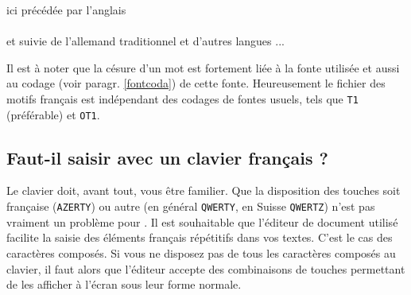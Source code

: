 \documentclass[a4paper,12pt,openright]{article}
\begin{document}
\begin{minipage}{12cm}
ici précédée par l'anglais \\[0.5ex]
\\[1ex]
et suivie de l'allemand traditionnel et d'autres langues ...
\end{minipage}
\indpos

Il est à noter que la césure d'un mot est fortement liée à la fonte utilisée
et aussi au codage (voir paragr. \ref{fontcoda}) de cette fonte. Heureusement le fichier
des motifs français est indépendant des codages de fontes usuels, tels que \texttt{T1}
 (préférable) et \texttt{OT1}.
\subsection{ Faut-il saisir avec un clavier français ?}
 Le clavier doit, avant tout, vous être familier. 
Que la disposition des touches  soit française
(\texttt{AZERTY}) ou autre (en général \texttt{QWERTY}, en Suisse \texttt{QWERTZ}) 
n'est pas vraiment un problème pour
\pgLapdTeX. Il est souhaitable que l'éditeur de document utilisé facilite la saisie
des éléments français répétitifs dans vos textes. C'est le cas des caractères
composés. Si vous ne disposez pas de tous les caractères composés au clavier,
il faut alors que l'éditeur accepte des combinaisons de touches permettant de
les afficher à l'écran sous leur forme normale. 
\end{document}
